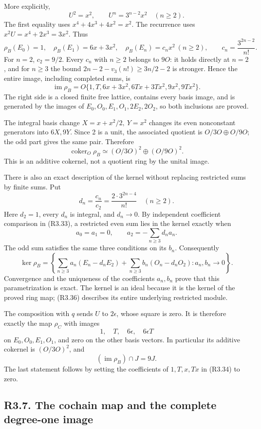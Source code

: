 \documentclass[
]{article}
\begin{document}
More explicitly, \[
U^2=x^2,\qquad U^n=3^{n-2}x^2\quad(n\ge2).
\tag{R3.32}
\] The first equality uses \(x^4+4x^3+4x^2=x^2\). The recurrence uses
\(x^2U=x^4+2x^3=3x^2\). Thus \[
\rho_B(E_0)=1,\quad \rho_B(E_1)=6x+3x^2,\quad
\rho_B(E_n)=c_nx^2\ (n\ge2),\qquad
c_n=\frac{3^{2n-2}}{n!}.
\tag{R3.33}
\] For \(n=2\), \(c_2=9/2\). Every \(c_n\) with \(n\ge2\) belongs to
\(9O\): it holds directly at \(n=2\), and for \(n\ge3\) the bound
\(2n-2-v_3(n!)\ge 3n/2-2\) is stronger. Hence the entire image,
including completed sums, is \[
\operatorname{im}\rho_B
=O\{1,T,6x+3x^2,6Tx+3Tx^2,9x^2,9Tx^2\}.
\tag{R3.34}
\] The right side is a closed finite free lattice, contains every basis
image, and is generated by the images of \(E_0,O_0,E_1,O_1,2E_2,2O_2\),
so both inclusions are proved.

The integral basis change \(X=x+x^2/2,\ Y=x^2\) changes its even
nonconstant generators into \(6X,9Y\). Since 2 is a unit, the associated
quotient is \(O/3O\oplus O/9O\); the odd part gives the same pair.
Therefore \[
\operatorname{coker}_O\rho_B
\simeq(O/3O)^2\oplus(O/9O)^2.
\tag{R3.35}
\] This is an additive cokernel, not a quotient ring by the unital
image.

There is also an exact description of the kernel without replacing
restricted sums by finite sums. Put \[
d_n=\frac{c_n}{c_2}=\frac{2\cdot3^{2n-4}}{n!}\quad(n\ge2).
\] Here \(d_2=1\), every \(d_n\) is integral, and \(d_n\to0\). By
independent coefficient comparison in (R3.33), a restricted even sum
lies in the kernel exactly when \[
a_0=a_1=0,\qquad
a_2=-\sum_{n\ge3}d_na_n.
\] The odd sum satisfies the same three conditions on its \(b_n\).
Consequently \[
\ker\rho_B=
\left\{
\sum_{n\ge3}a_n(E_n-d_nE_2)
+\sum_{n\ge3}b_n(O_n-d_nO_2):
a_n,b_n\to0
\right\}.
\tag{R3.36}
\] Convergence and the uniqueness of the coefficients \(a_n,b_n\) prove
that this parametrization is exact. The kernel is an ideal because it is
the kernel of the proved ring map; (R3.36) describes its entire
underlying restricted module.

The composition with \(q\) sends \(U\) to \(2\epsilon\), whose square is
zero. It is therefore exactly the map \(\rho_C\) with images \[
1,\quad T,\quad6\epsilon,\quad6\epsilon T
\] on \(E_0,O_0,E_1,O_1\), and zero on the other basis vectors. In
particular its additive cokernel is \((O/3O)^2\), and \[
(\operatorname{im}\rho_B)\cap J=9J.
\tag{R3.37}
\] The last statement follows by setting the coefficients of
\(1,T,x,Tx\) in (R3.34) to zero.

\subsection{R3.7. The cochain map and the complete degree-one
image}\label{r3.7.-the-cochain-map-and-the-complete-degree-one-image}
\end{document}
